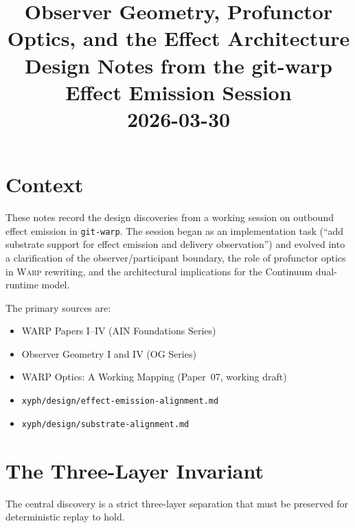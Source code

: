 \documentclass[11pt]{article}
\title{Observer Geometry, Profunctor Optics, and the Effect Architecture\\[6pt]
\large Design Notes from the git-warp Effect Emission Session\\[3pt]
\normalsize 2026-03-30}
\author{}
\date{}
\newcommand{\WARP}{\textsc{Warp}}
\theoremstyle{definition}
\begin{document}
\maketitle

\section{Context}

These notes record the design discoveries from a working session on
outbound effect emission in \texttt{git-warp}. The session began as an
implementation task (``add substrate support for effect emission and
delivery observation'') and evolved into a clarification of the
observer/participant boundary, the role of profunctor optics in
\WARP{} rewriting, and the architectural implications for the
Continuum dual-runtime model.

The primary sources are:
\begin{itemize}[leftmargin=2em]
\item WARP Papers I--IV (AI\textOmega{}N Foundations Series)
\item Observer Geometry I and IV (OG Series)
\item WARP Optics: A Working Mapping (Paper~07, working draft)
\item \texttt{xyph/design/effect-emission-alignment.md}
\item \texttt{xyph/design/substrate-alignment.md}
\end{itemize}

\section{The Three-Layer Invariant}

The central discovery is a strict three-layer separation that must be
preserved for deterministic replay to hold.
\end{document}
